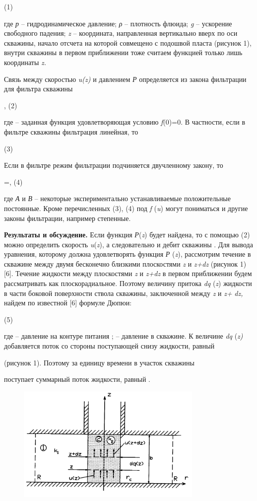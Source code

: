 \begin{multicols}{2}
(1)

где \emph{р} -- гидродинамическое давление; \emph{ρ} -- плотность
флюида; \emph{g} -- ускорение свободного падения; \emph{z} --
координата, направленная вертикально вверх по оси скважины, начало
отсчета на которой совмещено с подошвой пласта (рисунок 1), внутри
скважины в первом приближении тоже считаем функцией только лишь
координаты \emph{z.}

Связь между скоростью \emph{u(z)} и давлением \emph{Р} определяется из
закона фильтрации для фильтра скважины

, (2)

где 
-- заданная функция удовлетворяющая условию \emph{f}(0)=0. В частности,
если в фильтре скважины фильтрация линейная, то

(3)

Если в фильтре режим фильтрации подчиняется двучленному закону, то

=,
(4)

где \emph{А} и \emph{В} -- некоторые экспериментально устанавливаемые
положительные постоянные. Кроме перечисленных (3), (4) под \emph{f}
(\emph{u}) могут пониматься и другие законы фильтрации, например
степенные.

{\bfseries Результаты и обсуждение.} Если функция \emph{Р}(\emph{z}) будет
найдена, то с помощью (2) можно определить скорость \emph{u}(\emph{z}),
а следовательно и дебит скважины
. Для
вывода уравнения, которому должна удовлетворять функция \emph{Р}
(\emph{z}), рассмотрим течение в скважине между двумя бесконечно
близкими плоскостями \emph{z} и \emph{z+dz} (рисунок 1) {[}6{]}. Течение
жидкости между плоскостями \emph{z} и \emph{z+dz} в первом приближении
будем рассматривать как плоскорадиальное. Поэтому величину притока
\emph{dq} (\emph{z}) жидкости в части боковой поверхности ствола
скважины, заключенной между \emph{z} и \emph{z+} \emph{dz,} найдем по
известной {[}6{]} формуле Дюпюи:

(5)

где
--
давление на контуре питания
;
--
давление в скважине. К величине \emph{dq} (\emph{z)} добавляется поток
со стороны поступающей снизу жидкости, равный

(рисунок 1). Поэтому за единицу времени в участок скважины

поступает суммарный поток жидкости, равный
.
\end{multicols}


\begin{figure}[H]
	\centering
	\includegraphics[width=0.8\textwidth]{media/gorn/image17}
	\caption*{}
\end{figure}


